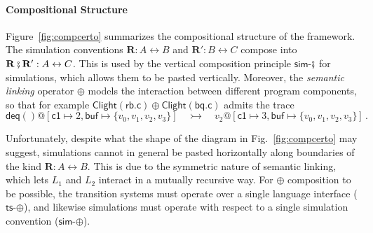 \documentclass[acmsmall,screen,review,anonymous,nonacm]{acmart}
\newcommand{\kw}[1]{\ensuremath{ \mathsf{#1} }}
\newcommand{\vcomp}{\fatsemi}
\begin{document}

\paragraph{Compositional Structure} %

Figure~\ref{fig:compcerto}
summarizes the compositional structure of the framework.
The simulation conventions $\mathbf{R} : A \leftrightarrow B$ and
$\mathbf{R}' : B \leftrightarrow C$
compose into
$\mathbf{R} \vcomp \mathbf{R}' : A \leftrightarrow C$.
This is used by the vertical composition principle \kw{sim}-$\vcomp$ for simulations,
which allows them to be pasted vertically.
Moreover,
the \emph{semantic linking} operator $\oplus$
models the interaction between different program components,
so that for example
$\kw{Clight}(\kw{rb.c}) \oplus \kw{Clight}(\kw{bq.c})$
admits the trace
\[
  \kw{deq}()@[\kw{c1} \mapsto 2, \kw{buf} \mapsto \{v_0, v_1, v_2, v_3\}]
  \quad\rightarrowtail\quad
  v_2@[\kw{c1} \mapsto 3, \kw{buf} \mapsto \{v_0, v_1, v_2, v_3\}]
  \,.
\]

Unfortunately,
despite what the shape of the diagram in Fig.~\ref{fig:compcerto} may suggest,
simulations cannot in general be pasted horizontally
along boundaries of the kind $\mathbf{R} : A \leftrightarrow B$.
This is due to the symmetric nature of semantic linking,
which lets $L_1$ and $L_2$ interact in a mutually recursive way.
For $\oplus$ composition to be possible,
the transition systems must operate
over a single language interface
($\kw{ts}$-$\oplus$),
and likewise simulations must operate
with respect to a single simulation convention
($\kw{sim}$-$\oplus$).
\end{document}
